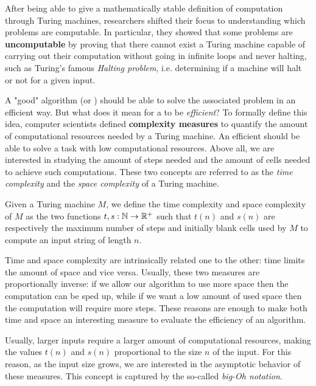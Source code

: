 After being able to give a mathematically stable definition of computation through Turing machines, researchers shifted their focus to understanding which problems are computable. In particular, they showed that some problems are \textbf{uncomputable} by proving that there cannot exist a Turing machine capable of carrying out their computation without going in infinite loops and never halting, such as Turing's famous \textit{Halting problem}, i.e. determining if a machine will halt or not for a given input.

A "good" algorithm (or \TM) should be able to solve the associated problem in an efficient way. But what does it mean for a \TM to be \textit{efficient}? To formally define this idea, computer scientists defined \textbf{complexity measures} to quantify the amount of computational resources needed by a Turing machine. An efficient \TM should be able to solve a task with low computational resources. Above all, we are interested in studying the amount of steps needed and the amount of cells needed to achieve such computations. These two concepts are referred to as the \textit{time complexity} and the \textit{space complexity} of a Turing machine.

\begin{definition}
 Given a Turing machine $M$, we define the time complexity and space complexity of $M$ as the two functions $t, s : \mathbb{N} \to \mathbb{R}^+$ such that $t(n)$ and $s(n)$ are respectively the maximum number of steps and initially blank cells used by $M$ to compute an input string of length $n$.
\end{definition}

Time and space complexity are intrinsically related one to the other: time limits the amount of space and vice versa. Usually, these two measures are proportionally inverse: if we allow our algorithm to use more space then the computation can be sped up, while if we want a low amount of used space then the computation will require more steps. These reasons are enough to make both time and space an interesting measure to evaluate the efficiency of an algorithm.

Usually, larger inputs require a larger amount of computational resources, making the values $t(n)$ and $s(n)$ proportional to the size $n$ of the input. For this reason, as the input size grows, we are interested in the asymptotic behavior of these measures. This concept is captured by the so-called \textit{big-Oh notation}.


